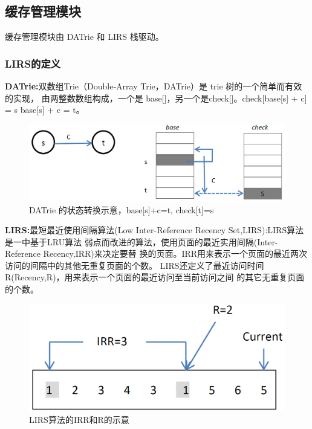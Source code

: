 

\subsection{缓存管理模块} 
\par{缓存管理模块由 DATrie 和 LIRS 栈驱动。}

\subsubsection{LIRS的定义}
\par{\textbf{DATrie:}双数组Trie（Double-Array  Trie，DATrie）是 trie 树的一个简单而有效的实现，
由两整数数组构成，一个是 base[]，另一个是check[]。check[base[s] + c] = s base[s] + c = t。
}

\begin{figure}[H]
\centering
\includegraphics[keepaspectratio, scale=0.4]{pitures/aaa.png}
\caption{ DATrie 的状态转换示意，base[s]+c=t, check[t]=s } 
\end{figure}

\par{\textbf{LIRS:}最短最近使用间隔算法(Low  Inter-Reference  Recency  Set,LIRS):LIRS算法是一中基于LRU算法
	弱点而改进的算法，使用页面的最近实用间隔(Inter-Reference Recency,IRR)来决定要替
	换的页面。IRR用来表示一个页面的最近两次访问的间隔中的其他无重复页面的个数。
	LIRS还定义了最近访问时间R(Recency,R)，用来表示一个页面的最近访问至当前访问之间
	的其它无重复页面的个数。
}

\begin{figure}[H]
\centering
\includegraphics[keepaspectratio, scale=0.4]{pitures/irr.png}
\caption{LIRS算法的IRR和R的示意} 
\end{figure}

